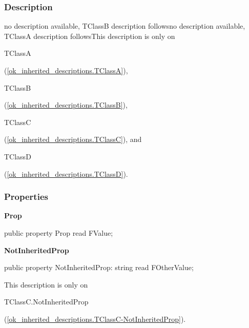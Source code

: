 \documentclass{report}
\newif\ifpdf
\begin{document}
\subsubsection*{\large{\textbf{Description}}\normalsize\hspace{1ex}\hfill}
no description available, TClassB description followsno description available, TClassA description followsThis description is only on \begin{ttfamily}TClassA\end{ttfamily}(\ref{ok_inherited_descriptions.TClassA}), \begin{ttfamily}TClassB\end{ttfamily}(\ref{ok_inherited_descriptions.TClassB}), \begin{ttfamily}TClassC\end{ttfamily}(\ref{ok_inherited_descriptions.TClassC}), and \begin{ttfamily}TClassD\end{ttfamily}(\ref{ok_inherited_descriptions.TClassD}).\subsubsection*{\large{\textbf{Properties}}\normalsize\hspace{1ex}\hfill}
\begin{list}{}{
\setlength{\itemindent}{0cm}
\setlength{\listparindent}{0cm}
\setlength{\leftmargin}{\evensidemargin}
\addtolength{\leftmargin}{\tmplength}
\settowidth{\labelsep}{X}
\addtolength{\leftmargin}{\labelsep}
\setlength{\labelwidth}{\tmplength}
}
\label{ok_inherited_descriptions.TClassC-Prop}
\item[\textbf{Prop}\hfill]
\ifpdf
\begin{flushleft}
\fi
\begin{ttfamily}
public property Prop read FValue;\end{ttfamily}

\ifpdf
\end{flushleft}
\fi


\par  \label{ok_inherited_descriptions.TClassC-NotInheritedProp}
\item[\textbf{NotInheritedProp}\hfill]
\ifpdf
\begin{flushleft}
\fi
\begin{ttfamily}
public property NotInheritedProp: string read FOtherValue;\end{ttfamily}

\ifpdf
\end{flushleft}
\fi


\par This description is only on \begin{ttfamily}TClassC.NotInheritedProp\end{ttfamily}(\ref{ok_inherited_descriptions.TClassC-NotInheritedProp}).\end{list}
\end{document}
